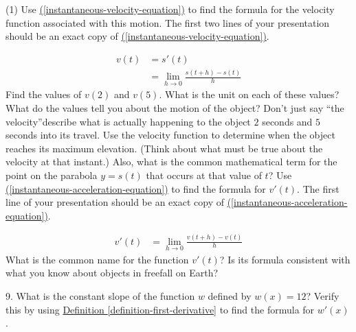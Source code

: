 \documentclass[10pt,oneside,]{book}
\theoremstyle{plain}
\theoremstyle{definition}
\numberwithin{equation}{section}
\newcommand{\fe}[2]{#1\mathopen{}\left(#2\right)\mathclose{}}
\newcommand{\fd}[1]{#1'}
\begin{document}
\begin{exercisegroup}(1)
\exercise[4.]\hypertarget{exercise-187}{\null}Use \hyperref[instantaneous-velocity-equation]{(\ref{instantaneous-velocity-equation})} to find the formula for the velocity function associated with this motion. The first two lines of your presentation should be an exact copy of \hyperref[instantaneous-velocity-equation]{(\ref{instantaneous-velocity-equation})}.%
\par
\begin{align}
\fe{v}{t}&=\fe{\fd{s}}{t}\label{instantaneous-velocity-equation}\\
&=\lim_{h\to0}\frac{\fe{s}{t+h}-\fe{s}{t}}{h}\label{mrow-223}
\end{align}%
\exercise[5.]\hypertarget{exercise-188}{\null}Find the values of \(\fe{v}{2}\) and \(\fe{v}{5}\). What is the unit on each of these values? What do the values tell you about the motion of the object? Don't just say ``the velocity''\textemdash{}describe what is actually happening to the object \(2\) seconds and \(5\) seconds into its travel.%
\exercise[6.]\hypertarget{exercise-189}{\null} Use the velocity function to determine when the object reaches its maximum elevation. (Think about what must be true about the velocity at that instant.) Also, what is the common mathematical term for the point on the parabola \(y=\fe{s}{t}\) that occurs at that value of \(t\)?%
\exercise[7.]\hypertarget{exercise-190}{\null}Use \hyperref[instantaneous-acceleration-equation]{(\ref{instantaneous-acceleration-equation})} to find the formula for \(\fe{\fd{v}}{t}\). The first line of your presentation should be an exact copy of \hyperref[instantaneous-acceleration-equation]{(\ref{instantaneous-acceleration-equation})}.%
\par
\begin{align}
\fe{\fd{v}}{t}&=\lim_{h\to0}\frac{\fe{v}{t+h}-\fe{v}{t}}{h}\label{instantaneous-acceleration-equation}
\end{align}%
\exercise[8.]\hypertarget{exercise-191}{\null}What is the common name for the function \(\fe{\fd{v}}{t}\)? Is its formula consistent with what you know about objects in freefall on Earth?%
\end{exercisegroup}
\par\smallskip\noindent
\begin{exerciselist}
\item[9.]\hypertarget{exercise-192}{\null}What is the constant slope of the function \(w\) defined by \(\fe{w}{x}=12\)? Verify this by using \hyperref[definition-first-derivative]{Definition \ref{definition-first-derivative}} to find the formula for \(\fe{\fd{w}}{x}\).%
\par\smallskip
\end{exerciselist}
\typeout{************************************************}
\typeout{************************************************}
\end{document}

